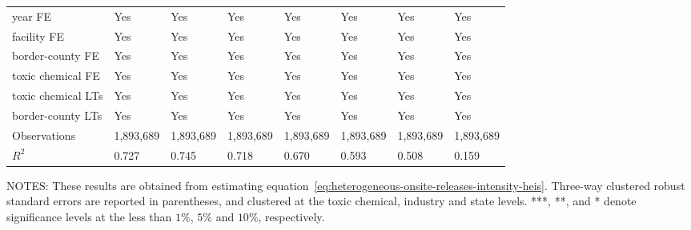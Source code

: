 \begin{table}[H]
{\begin{tabular}{@{}llllllll@{}}
            year FE                         & Yes       & Yes           & Yes       & Yes          & Yes             & Yes           & Yes                 \\
            facility FE                     & Yes       & Yes           & Yes       & Yes          & Yes             & Yes           & Yes                 \\
            border-county FE                & Yes       & Yes           & Yes       & Yes          & Yes             & Yes           & Yes                 \\
            toxic chemical FE               & Yes       & Yes           & Yes       & Yes          & Yes             & Yes           & Yes                 \\
            toxic chemical LTs              & Yes       & Yes           & Yes       & Yes          & Yes             & Yes           & Yes                 \\
            border-county LTs               & Yes       & Yes           & Yes       & Yes          & Yes             & Yes           & Yes                 \\\midrule
            Observations                    & 1,893,689 & 1,893,689     & 1,893,689 & 1,893,689    & 1,893,689       & 1,893,689     & 1,893,689           \\
            $R^2$                           & 0.727     & 0.745         & 0.718     & 0.670        & 0.593           & 0.508         & 0.159               \\ \bottomrule \bottomrule
        \end{tabular}%
    }
    \begin{minipage}{\columnwidth}
        \vspace{0.05in}
        \tiny NOTES: These results are obtained from estimating equation~\ref{eq:heterogeneous-onsite-releases-intensity-heis}. Three-way clustered robust standard errors are reported in parentheses, and clustered at the toxic chemical, industry and state levels. ***, **, and * denote significance levels at the less than $1\%$, $5\%$ and $10\%$, respectively.
    \end{minipage}
\end{table}